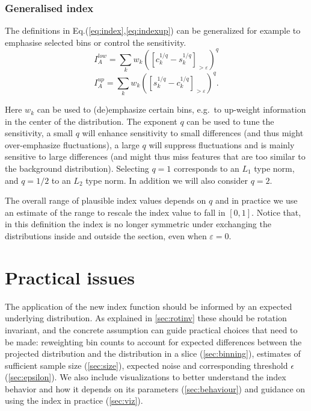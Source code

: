 \documentclass[]{interact}
\theoremstyle{plain}%
\theoremstyle{definition}
\theoremstyle{remark}
\begin{document}
\hypertarget{sec:generalise}{%
\subsubsection*{Generalised index}\label{sec:generalise}}

The definitions in Eq.(\ref{eq:index},\ref{eq:indexup}) can be
generalized for example to emphasise selected bins or control the
sensitivity. \begin{equation}
I_A^{low} = \sum_{k}w_{k}\left(\left[c_{k}^{1/q}-s_{k}^{1/q}\right]_{>\varepsilon}\right)^{q}
\label{eq:index2}
\end{equation} \begin{equation}
I_A^{up} = \sum_{k}w_{k}\left(\left[s_{k}^{1/q}-c_{k}^{1/q}\right]_{>\varepsilon}\right)^{q}.
\label{eq:index2up}
\end{equation}

Here \(w_k\) can be used to (de)emphasize certain bins, e.g.~to
up-weight information in the center of the distribution. The exponent
\(q\) can be used to tune the sensitivity, a small \(q\) will enhance
sensitivity to small differences (and thus might over-emphasize
fluctuations), a large \(q\) will suppress fluctuations and is mainly
sensitive to large differences (and might thus miss features that are
too similar to the background distribution). Selecting \(q=1\)
corresponds to an \(L_1\) type norm, and \(q=1/2\) to an \(L_2\) type
norm. In addition we will also consider \(q=2\).

The overall range of plausible index values depends on \(q\) and in
practice we use an estimate of the range to rescale the index value to
fall in \([0,1]\). Notice that, in this definition the index is no
longer symmetric under exchanging the distributions inside and outside
the section, even when \(\varepsilon=0\).

\hypertarget{practical-issues}{%
\section{\texorpdfstring{Practical issues
\label{sec:practical}}{Practical issues }}\label{practical-issues}}

The application of the new index function should be informed by an
expected underlying distribution. As explained in \ref{sec:rotinv} these
should be rotation invariant, and the concrete assumption can guide
practical choices that need to be made: reweighting bin counts to
account for expected differences between the projected distribution and
the distribution in a slice (\ref{sec:binning}), estimates of sufficient
sample size (\ref{sec:size}), expected noise and corresponding threshold
\(\epsilon\) (\ref{sec:epsilon}). We also include visualizations to
better understand the index behavior and how it depends on its
parameters (\ref{sec:behaviour}) and guidance on using the index in
practice (\ref{sec:viz}).
\end{document}
